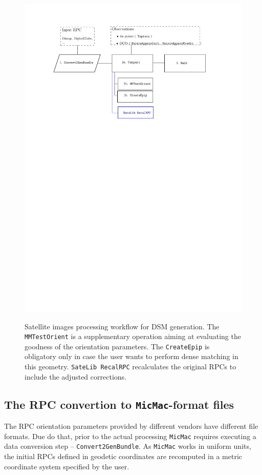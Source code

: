 \begin{figure}[h!]
\centering 
{\includegraphics[width=0.88\linewidth]{FIGS/Satellites/usingSatellites.pdf}\label{FIG:sat:func}}
\caption{ Satellite images processing workflow for DSM generation. The {\tt MMTestOrient} is a supplementary operation aiming at evaluating the goodness of the orientation parameters. The {\tt CreateEpip} is obligatory only in case the user wants to perform dense matching in this geometry. {\tt{SateLib RecalRPC}} recalculates the original RPCs to include the adjusted corrections.}
\end{figure}

\subsection{ The RPC convertion to {\tt MicMac}-format files}\label{subsec:rpcConv}
The RPC orientation parameters provided by different vendors have different file formats. Due do that, prior to the actual processing {\tt MicMac} requires executing a data conversion step -- {\tt Convert2GenBundle}. As {\tt MicMac} works in uniform units, the initial RPCs defined in geodetic coordinates are recomputed in a metric coordinate system specified by the user.

